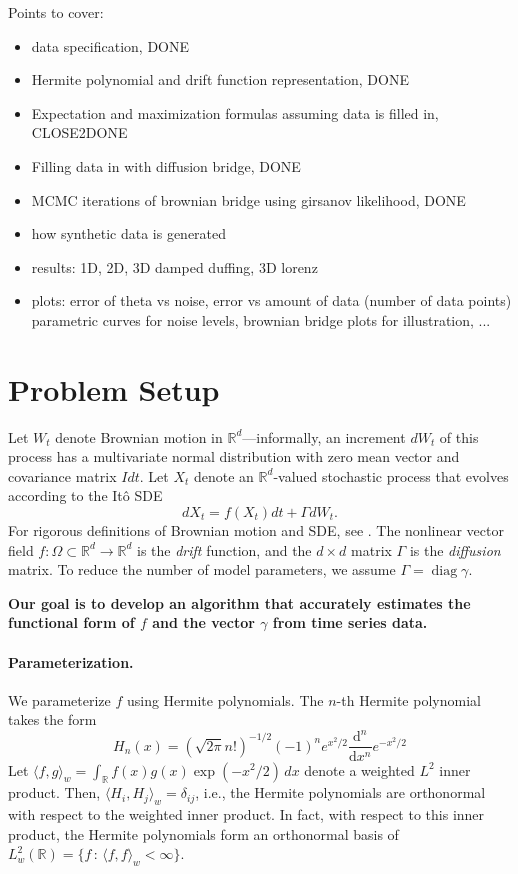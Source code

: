 \documentclass{article}
\newcommand{\opdiag}{\ensuremath{\operatorname{diag}}}
\begin{document}
Points to cover:
\begin{itemize}
\item data specification, DONE
\item Hermite polynomial and drift function representation, DONE
\item Expectation and maximization formulas assuming data is filled in, CLOSE2DONE
\item Filling data in with diffusion bridge, DONE
\item MCMC iterations of brownian bridge using girsanov likelihood, DONE
\item how synthetic data is generated
\item results: 1D, 2D, 3D damped duffing, 3D lorenz
\item plots: error of theta vs noise, error vs amount of data (number of data points) parametric curves for noise levels, brownian bridge plots for illustration, ...
\end{itemize}

\section{Problem Setup}
Let $W_t$ denote Brownian motion in $\mathbb{R}^d$---informally, an increment $dW_t$ of this process has a multivariate normal distribution with zero mean vector and covariance matrix $I dt$.  Let $X_t$ denote an $\mathbb{R}^d$-valued stochastic process that evolves according to the It\^{o} SDE
\begin{equation} \label{eqn:sde}
d X_t = f( X_t) dt + \Gamma d W_t.
\end{equation}
For rigorous definitions of Brownian motion and SDE, see \cite{bhattacharya_stochastic_2009, oksendal_stochastic_2003}.  The nonlinear vector field $f : \Omega \subset \mathbb{R}^d \to \mathbb{R}^d$ is the \emph{drift} function, and the $d \times d$ matrix $\Gamma$ is the \emph{diffusion} matrix.  To reduce the number of model parameters, we assume $\Gamma = \opdiag \gamma$.

\textbf{Our goal is to develop an algorithm that accurately estimates the functional form of $f$ and the vector $\gamma$ from time series data.}

\paragraph{Parameterization.} We parameterize $f$ using Hermite polynomials.  The $n$-th Hermite polynomial takes the form
\begin{equation}
\label{eqn:hermdef}
H_n(x) = (\sqrt{2 \pi} n!)^{-1/2} (-1)^n e^{x^2/2} \dfrac{\mathrm{d}^n}{\mathrm{d}x^n} e^{-x^2/2}
\end{equation}
Let $\langle f, g \rangle_w = \int_{\mathbb{R}} f(x) g(x) \exp(-x^2/2) \, dx$ denote a weighted $L^2$ inner product.  Then, $\langle H_i, H_j \rangle_w = \delta_{ij}$, i.e., the Hermite polynomials are orthonormal with respect to the weighted inner product.  In fact, with respect to this inner product, the Hermite polynomials form an orthonormal basis of $L^2_w(\mathbb{R}) = \{ f \, : \, \langle f, f \rangle_w < \infty \}$.
\end{document}
